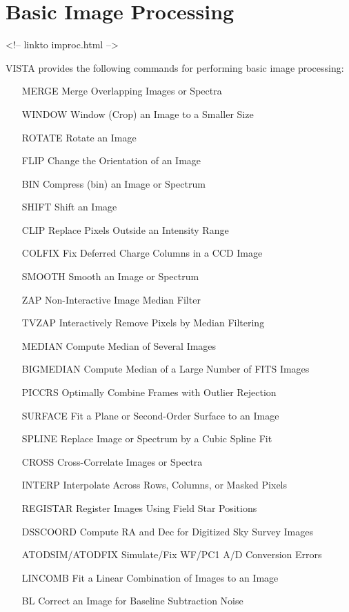 \chapter{Basic Image Processing}
\begin{rawhtml}
<!-- linkto improc.html -->
\end{rawhtml}

%
%
%
%

VISTA provides the following commands for performing basic image
processing:
\begin{itemize}
  \item[MERGE\hfill]{Merge Overlapping Images or Spectra}
  \item[WINDOW\hfill]{Window (Crop) an Image to a Smaller Size}
  \item[ROTATE\hfill]{Rotate an Image}
  \item[FLIP\hfill]{Change the Orientation of an Image}
  \item[BIN\hfill]{Compress (bin) an Image or Spectrum}
  \item[SHIFT\hfill]{Shift an Image}
  \item[CLIP\hfill]{Replace Pixels Outside an Intensity Range}
  \item[COLFIX\hfill]{Fix Deferred Charge Columns in a CCD Image}
  \item[SMOOTH\hfill]{Smooth an Image or Spectrum}
  \item[ZAP\hfill]{Non-Interactive Image Median Filter}
  \item[TVZAP\hfill]{Interactively Remove Pixels by Median Filtering}
  \item[MEDIAN\hfill]{Compute Median of Several Images}
  \item[BIGMEDIAN\hfill]{Compute Median of a Large Number of FITS Images}
  \item[PICCRS\hfill]{Optimally Combine Frames with Outlier Rejection}
  \item[SURFACE\hfill]{Fit a Plane or Second-Order Surface to an Image}
  \item[SPLINE\hfill]{Replace Image or Spectrum by a Cubic Spline Fit}
  \item[CROSS\hfill]{Cross-Correlate Images or Spectra}
  \item[INTERP\hfill]{Interpolate Across Rows, Columns, or Masked Pixels}
  \item[REGISTAR\hfill]{Register Images Using Field Star Positions}
  \item[DSSCOORD\hfill]{Compute RA and Dec for Digitized Sky Survey Images}
  \item[ATODSIM/ATODFIX\hfill]{Simulate/Fix WF/PC1 A/D Conversion Errors}
  \item[LINCOMB\hfill]{Fit a Linear Combination of Images to an Image}
  \item[BL\hfill]{Correct an Image for Baseline Subtraction Noise}
\end{itemize}

